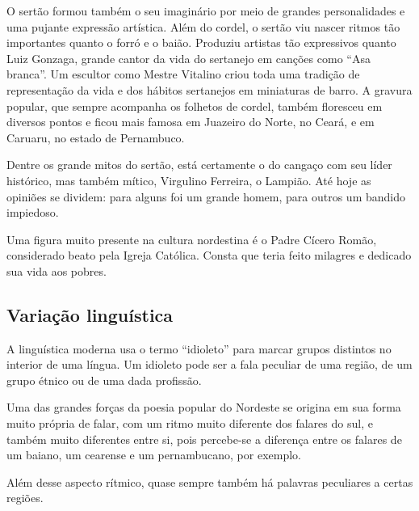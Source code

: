 O sertão formou também o seu imaginário por meio de grandes
personalidades e uma pujante expressão artística. Além do cordel, o
sertão viu nascer ritmos tão importantes quanto o forró e o baião.
Produziu artistas tão expressivos quanto Luiz Gonzaga, grande cantor da
vida do sertanejo em canções como ``Asa
branca''. Um escultor como Mestre Vitalino criou toda
uma tradição de representação da vida e dos hábitos sertanejos em
miniaturas de barro. A gravura popular, que sempre acompanha os
folhetos de cordel, também floresceu em diversos pontos e ficou mais
famosa em Juazeiro do Norte, no Ceará, e em Caruaru, no estado de
Pernambuco. 

Dentre os grande mitos do sertão, está certamente o do cangaço com seu
líder histórico, mas também mítico, Virgulino Ferreira, o Lampião. Até
hoje as opiniões se dividem: para alguns foi um grande homem, para
outros um bandido impiedoso. 

Uma figura muito presente na cultura nordestina é o Padre Cícero Romão,
considerado beato pela Igreja Católica. Consta que teria feito milagres
e dedicado sua vida aos pobres. 

\subsection{Variação linguística}

A linguística moderna usa o termo ``idioleto'' para marcar grupos
distintos no interior de uma língua. Um idioleto pode ser a fala
peculiar de uma região, de um grupo étnico ou de uma dada profissão. 

Uma das grandes forças da poesia popular do Nordeste se origina em sua
forma muito própria de falar, com um ritmo muito diferente dos falares
do sul, e também muito diferentes entre si, pois percebe-se a diferença
entre os falares de um baiano, um cearense e um pernambucano, por
exemplo.

Além desse aspecto rítmico, quase sempre também há palavras peculiares a
certas regiões. 

